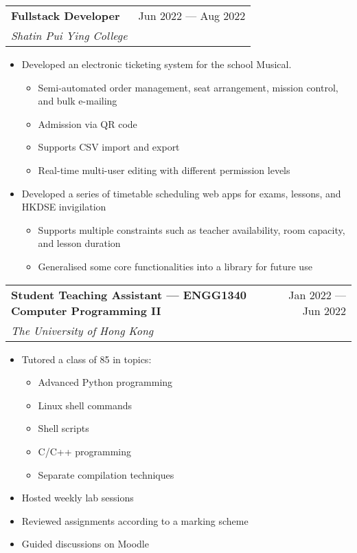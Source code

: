 \documentclass{article}
\newcommand{\jobTitle}[3]{
\begin{tabularx}{\linewidth}{ X r }
    \textbf{#1} & #2\\
    \textit{#3} &
\end{tabularx}
}
\begin{document}
\jobTitle
{Fullstack Developer}
{Jun 2022 --- Aug 2022}
{Shatin Pui Ying College}
\begin{itemize}[leftmargin=1.2cm]
    \item Developed an electronic ticketing system for the school Musical.
    \begin{itemize}
        \item Semi-automated order management, seat arrangement, mission control, and bulk e-mailing
        \item Admission via QR code
        \item Supports CSV import and export
        \item Real-time multi-user editing with different permission levels
    \end{itemize}
    \item Developed a series of timetable scheduling web apps for exams, lessons, and HKDSE invigilation
    \begin{itemize}
        \item Supports multiple constraints such as teacher availability, room capacity, and lesson duration
        \item Generalised some core functionalities into a library for future use
    \end{itemize}
\end{itemize}

\jobTitle
{Student Teaching Assistant --- ENGG1340 Computer Programming II}
{Jan 2022 --- Jun 2022}
{The University of Hong Kong}
\begin{itemize}[leftmargin=1.2cm]
    \item Tutored a class of 85 in topics:
    \begin{itemize}
        \item Advanced Python programming
        \item Linux shell commands
        \item Shell scripts
        \item C/C++ programming
        \item Separate compilation techniques
    \end{itemize}
    \item Hosted weekly lab sessions
    \item Reviewed assignments according to a marking scheme
    \item Guided discussions on Moodle
\end{itemize}
\end{document}
